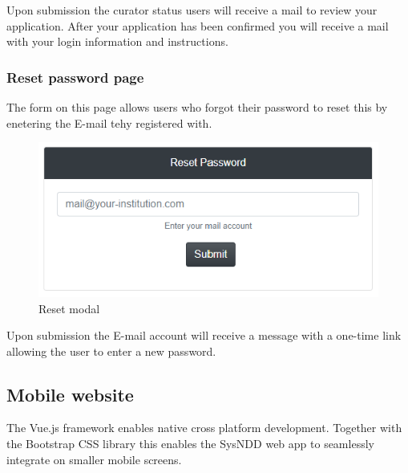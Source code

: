 \documentclass[
]{article}
\begin{document}
Upon submission the curator status users will receive a mail to review your application. After your application has been confirmed you will receive a mail with your login information and instructions.

\hypertarget{reset-password-page}{%
\subsubsection{Reset password page}\label{reset-password-page}}

The form on this page allows users who forgot their password to reset this by enetering the E-mail tehy registered with.

\begin{figure}
\centering
\includegraphics{./static/img/02_18-password-reset-modal.png}
\caption{Reset modal}
\end{figure}

Upon submission the E-mail account will receive a message with a one-time link allowing the user to enter a new password.

\hypertarget{mobile-website}{%
\subsection{Mobile website}\label{mobile-website}}

The Vue.js framework enables native cross platform development. Together with the Bootstrap CSS library this enables the SysNDD web app to seamlessly integrate on smaller mobile screens.
\end{document}
